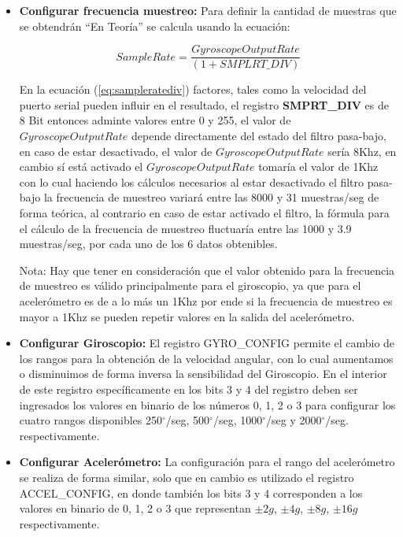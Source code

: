 \documentclass[12pt,a4paper]{article}
\newcommand{\grad}{$^{\circ}$}
\begin{document}
\begin{itemize}
	\item \textbf{Configurar frecuencia muestreo:} Para definir la cantidad de muestras que se obtendrán ``En Teoría'' se calcula usando la ecuación: 
	
	\begin{equation} 
		\label{eq:sampleratediv}
		Sample Rate = \frac{Gyroscope Output Rate}{(1 + SMPLRT\_DIV) }
	\end{equation}
	
	En la ecuación (\ref{eq:sampleratediv}) factores, tales como la velocidad del puerto serial pueden influir en el resultado, el registro \textbf{SMPRT\_DIV} es de 8 Bit entonces adminte valores entre 0 y 255, el valor de $Gyroscope Output Rate$ depende directamente del estado del filtro pasa-bajo, en caso de estar desactivado, el valor de $Gyroscope Output Rate$ sería 8Khz, en cambio sí está activado el $Gyroscope Output Rate$ tomaría el valor de 1Khz con lo cual haciendo los cálculos necesarios al estar desactivado el filtro pasa-bajo la frecuencia de muestreo variará entre las 8000 y 31 muestras/seg de forma teórica, al contrario en caso de estar activado el filtro, la fórmula para el cálculo de la frecuencia de muestreo fluctuaría entre las 1000 y 3.9 muestras/seg, por cada uno de los 6 datos obtenibles.
	
	Nota: Hay que tener en consideración que el valor obtenido para la frecuencia de muestreo es válido principalmente para el giroscopio, ya que para el acelerómetro es de a lo más un 1Khz por ende si la frecuencia de muestreo es mayor a 1Khz se pueden repetir valores en la salida del acelerómetro.
	
	\item \textbf{Configurar Giroscopio:} El registro GYRO\_CONFIG permite el cambio de los rangos para la obtención de la velocidad angular, con lo cual aumentamos o disminuimos de forma inversa la sensibilidad del Giroscopio. En el interior de este registro específicamente en los bits 3 y 4 del registro deben ser ingresados los valores en binario de los números 0, 1, 2 o 3 para configurar los cuatro rangos disponibles 250\grad/seg, 500\grad/seg, 1000\grad/seg y 2000\grad/seg. respectivamente.
	
	\item \textbf{Configurar Acelerómetro:} La configuración para el rango del acelerómetro se realiza de forma similar, solo que en cambio es utilizado el registro ACCEL\_CONFIG, en donde también los bits 3 y 4 corresponden a los valores en binario de 0, 1, 2 o 3 que representan $\pm 2g$, $\pm 4g$, $\pm 8g$, $\pm 16g$ respectivamente.
	
\end{itemize}
\end{document}
